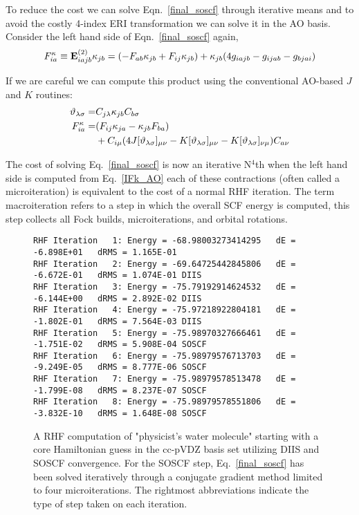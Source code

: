 \documentclass[aip,jcp,preprint,superscriptaddress,floatfix]{revtex4-1}
\begin{document}
To reduce the cost we can solve Eqn.~\ref{final_soscf} through iterative means and to avoid the costly 4-index ERI transformation we can solve it in the AO basis.
Consider the left hand side of Eqn.~\ref{final_soscf} again,
\begin{eqnarray}
\label{soscf_iter}
{F}^{\kappa}_{ia}\equiv {\rm\bf E}^{(2)}_{iajb}\kappa_{jb} = (-{F}_{ab}\kappa_{jb} + {F}_{ij}\kappa_{jb}) + \kappa_{jb}(4 g_{iajb} - g_{ijab} - g_{bjai})
\end{eqnarray}

If we are careful we can compute this product using the conventional AO-based $J$ and $K$ routines:
\begin{align}
\label{IFk_AO}
\vartheta _{\lambda\sigma} =& C_{j\lambda}\kappa_{jb}C_{b\sigma}\\
{F}^{\kappa}_{ia} =& ({F}_{ij}\kappa_{ja} - \kappa_{jb}{F}_{ba}) \notag\\&+ C_{i\mu}
(4 J[\vartheta_{\lambda\sigma}]_{\mu\nu} - K[\vartheta_{\lambda\sigma}]_{\mu\nu} - K[\vartheta_{\lambda\sigma}]_{\nu\mu})C_{a\nu}
\label{IFk_AO}
\end{align}

The cost of solving Eq.~\ref{final_soscf} is now an iterative N$^4$th when the left hand side is computed from Eq.~\ref{IFk_AO} each of these contractions (often called a microiteration) is equivalent to the cost of a normal RHF iteration.
The term macroiteration refers to a step in which the overall SCF energy is computed, this step collects all Fock builds, microiterations, and orbital rotations.

\begin{figure}[htbp]
\begin{center}
\caption{A RHF computation of "physicist's water molecule" starting with a core Hamiltonian guess in the cc-pVDZ basis set utilizing DIIS and SOSCF convergence. For the SOSCF step, Eq.~\ref{final_soscf} has been solved iteratively through a conjugate gradient method limited to four microiterations. The rightmost abbreviations indicate the type of step taken on each iteration.}
\label{rhf_water_soscf_iter}
{\footnotesize\linespread{1}\normalfont\ttfamily
\begin{verbatim}
RHF Iteration   1: Energy = -68.98003273414295   dE = -6.898E+01   dRMS = 1.165E-01
RHF Iteration   2: Energy = -69.64725442845806   dE = -6.672E-01   dRMS = 1.074E-01 DIIS
RHF Iteration   3: Energy = -75.79192914624532   dE = -6.144E+00   dRMS = 2.892E-02 DIIS
RHF Iteration   4: Energy = -75.97218922804181   dE = -1.802E-01   dRMS = 7.564E-03 DIIS
RHF Iteration   5: Energy = -75.98970327666461   dE = -1.751E-02   dRMS = 5.908E-04 SOSCF
RHF Iteration   6: Energy = -75.98979576713703   dE = -9.249E-05   dRMS = 8.777E-06 SOSCF
RHF Iteration   7: Energy = -75.98979578513478   dE = -1.799E-08   dRMS = 8.237E-07 SOSCF
RHF Iteration   8: Energy = -75.98979578551806   dE = -3.832E-10   dRMS = 1.648E-08 SOSCF
\end{verbatim}}
\end{center}
\end{figure}
\end{document}

